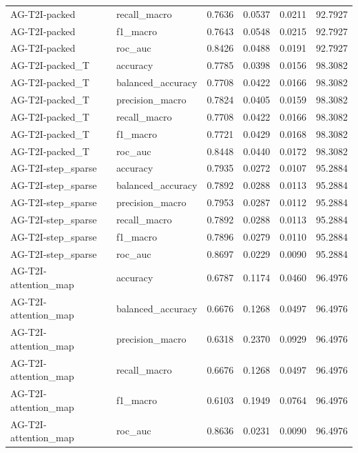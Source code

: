 \begin{tabular}{llrrrr}
AG-T2I-packed & recall_macro & 0.7636 & 0.0537 & 0.0211 & 92.7927 \\
AG-T2I-packed & f1_macro & 0.7643 & 0.0548 & 0.0215 & 92.7927 \\
AG-T2I-packed & roc_auc & 0.8426 & 0.0488 & 0.0191 & 92.7927 \\
AG-T2I-packed_T & accuracy & 0.7785 & 0.0398 & 0.0156 & 98.3082 \\
AG-T2I-packed_T & balanced_accuracy & 0.7708 & 0.0422 & 0.0166 & 98.3082 \\
AG-T2I-packed_T & precision_macro & 0.7824 & 0.0405 & 0.0159 & 98.3082 \\
AG-T2I-packed_T & recall_macro & 0.7708 & 0.0422 & 0.0166 & 98.3082 \\
AG-T2I-packed_T & f1_macro & 0.7721 & 0.0429 & 0.0168 & 98.3082 \\
AG-T2I-packed_T & roc_auc & 0.8448 & 0.0440 & 0.0172 & 98.3082 \\
AG-T2I-step_sparse & accuracy & 0.7935 & 0.0272 & 0.0107 & 95.2884 \\
AG-T2I-step_sparse & balanced_accuracy & 0.7892 & 0.0288 & 0.0113 & 95.2884 \\
AG-T2I-step_sparse & precision_macro & 0.7953 & 0.0287 & 0.0112 & 95.2884 \\
AG-T2I-step_sparse & recall_macro & 0.7892 & 0.0288 & 0.0113 & 95.2884 \\
AG-T2I-step_sparse & f1_macro & 0.7896 & 0.0279 & 0.0110 & 95.2884 \\
AG-T2I-step_sparse & roc_auc & 0.8697 & 0.0229 & 0.0090 & 95.2884 \\
AG-T2I-attention_map & accuracy & 0.6787 & 0.1174 & 0.0460 & 96.4976 \\
AG-T2I-attention_map & balanced_accuracy & 0.6676 & 0.1268 & 0.0497 & 96.4976 \\
AG-T2I-attention_map & precision_macro & 0.6318 & 0.2370 & 0.0929 & 96.4976 \\
AG-T2I-attention_map & recall_macro & 0.6676 & 0.1268 & 0.0497 & 96.4976 \\
AG-T2I-attention_map & f1_macro & 0.6103 & 0.1949 & 0.0764 & 96.4976 \\
AG-T2I-attention_map & roc_auc & 0.8636 & 0.0231 & 0.0090 & 96.4976 \\
\bottomrule
\end{tabular}
